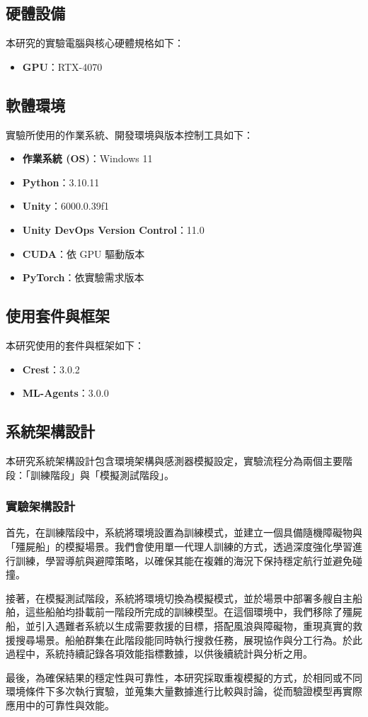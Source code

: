 \documentclass[12pt,a4paper]{article}
\begin{document}
\subsection{硬體設備}
本研究的實驗電腦與核心硬體規格如下：
\begin{itemize}
  	\item \textbf{GPU}：RTX-4070
\end{itemize}

\subsection{軟體環境}
實驗所使用的作業系統、開發環境與版本控制工具如下：
\begin{itemize}
    \item \textbf{作業系統 (OS)}：Windows 11
    \item \textbf{Python}：3.10.11
    \item \textbf{Unity}：6000.0.39f1
    \item \textbf{Unity DevOps Version Control}：11.0
    \item \textbf{CUDA}：依 GPU 驅動版本
    \item \textbf{PyTorch}：依實驗需求版本
\end{itemize}

\subsection{使用套件與框架}
本研究使用的套件與框架如下：
\begin{itemize}
    \item \textbf{Crest}：3.0.2
    \item \textbf{ML-Agents}：3.0.0
\end{itemize}

\subsection{系統架構設計}
本研究系統架構設計包含環境架構與感測器模擬設定，實驗流程分為兩個主要階段：「訓練階段」與「模擬測試階段」。

\subsubsection{實驗架構設計}
首先，在訓練階段中，系統將環境設置為訓練模式，並建立一個具備隨機障礙物與「殭屍船」的模擬場景。我們會使用單一代理人訓練的方式，透過深度強化學習進行訓練，學習導航與避障策略，以確保其能在複雜的海況下保持穩定航行並避免碰撞。
\\ \par
接著，在模擬測試階段，系統將環境切換為模擬模式，並於場景中部署多艘自主船舶，這些船舶均掛載前一階段所完成的訓練模型。在這個環境中，我們移除了殭屍船，並引入遇難者系統以生成需要救援的目標，搭配風浪與障礙物，重現真實的救援搜尋場景。船舶群集在此階段能同時執行搜救任務，展現協作與分工行為。於此過程中，系統持續記錄各項效能指標數據，以供後續統計與分析之用。
\\ \par
最後，為確保結果的穩定性與可靠性，本研究採取重複模擬的方式，於相同或不同環境條件下多次執行實驗，並蒐集大量數據進行比較與討論，從而驗證模型再實際應用中的可靠性與效能。
\end{document}
